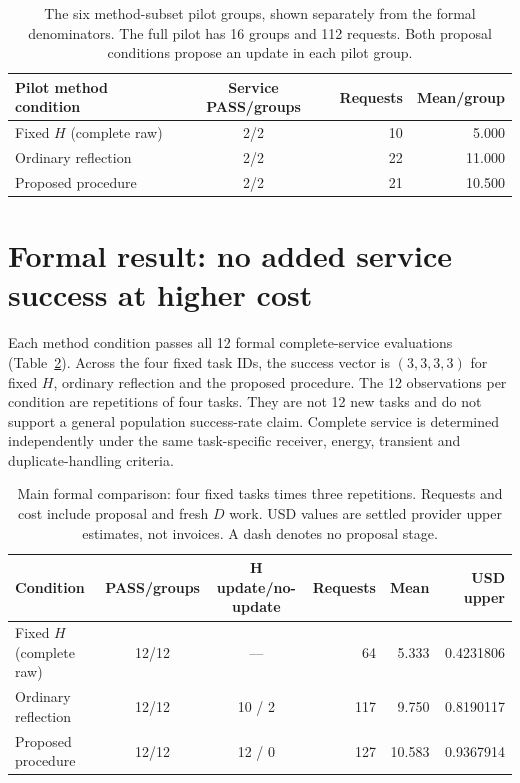 \begin{table}[htbp]
\centering
\begin{tabular}{@{}lcrr@{}}
\toprule
Pilot method condition & Service PASS/groups & Requests & Mean/group \\
\midrule
Fixed $H$ (complete raw) & 2/2 & 10 & 5.000 \\
Ordinary reflection & 2/2 & 22 & 11.000 \\
Proposed procedure & 2/2 & 21 & 10.500 \\
\bottomrule
\end{tabular}
\caption{The six method-subset pilot groups, shown separately from the formal
denominators. The full pilot has 16 groups and 112 requests. Both proposal
conditions propose an update in each pilot group.}
\label{tab:pilot}
\end{table}

\section{Formal result: no added service success at higher cost}
Each method condition passes all 12 formal complete-service evaluations
(Table~\ref{tab:main}). Across the four fixed task IDs, the success vector
is $(3,3,3,3)$ for fixed $H$, ordinary reflection and the proposed procedure.
The 12 observations per condition are repetitions of four tasks. They are not
12 new tasks and do not support a general population success-rate claim.
Complete service is determined independently under the same task-specific
receiver, energy, transient and duplicate-handling criteria.

\begin{table}[htbp]
\centering
\small
\begin{tabular}{@{}lccrrr@{}}
\toprule
Condition & PASS/groups & H update/no-update & Requests & Mean & USD upper \\
\midrule
Fixed $H$ (complete raw) & 12/12 & --- & 64 & 5.333 & 0.4231806 \\
Ordinary reflection & 12/12 & 10 / 2 & 117 & 9.750 & 0.8190117 \\
Proposed procedure & 12/12 & 12 / 0 & 127 & 10.583 & 0.9367914 \\
\bottomrule
\end{tabular}
\caption{Main formal comparison: four fixed tasks times three repetitions.
Requests and cost include proposal and fresh $D$ work. USD values are settled
provider upper estimates, not invoices. A dash denotes no proposal stage.}
\label{tab:main}
\end{table}

